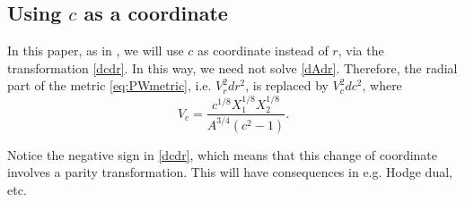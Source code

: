 \subsection{Using $c$ as a coordinate}

In this paper, as in \cite{Buchel:2000cn}, we will use $c$ as coordinate instead of $r$, via the transformation \eqref{dcdr}. 
In this way, we need not solve \eqref{dAdr}. 
Therefore, the radial part of the metric \eqref{eq:PWmetric}, i.e. $V_r^2 dr^2$, is replaced by $V_c^2 dc^2$, where
\begin{equation}
 V_c = \frac{c^{1/8}X_1^{1/8} X_2^{1/8}}{A^{3/4} (c^2-1)}.
\end{equation}


Notice the negative sign in \eqref{dcdr}, which means that this change of coordinate involves a parity transformation. This will have consequences in e.g. Hodge dual, etc.






